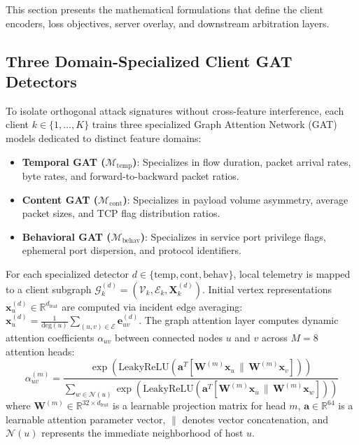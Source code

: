 \documentclass[12pt,a4paper]{report}
\begin{document}
This section presents the mathematical formulations that define the client encoders, loss objectives, server overlay, and downstream arbitration layers.

\subsection{Three Domain-Specialized Client GAT Detectors}
To isolate orthogonal attack signatures without cross-feature interference, each client $k \in \{1, \dots, K\}$ trains three specialized Graph Attention Network (GAT) models dedicated to distinct feature domains:
\begin{itemize}
    \item \textbf{Temporal GAT ($\mathcal{M}_{\text{temp}}$)}: Specializes in flow duration, packet arrival rates, byte rates, and forward-to-backward packet ratios.
    \item \textbf{Content GAT ($\mathcal{M}_{\text{cont}}$)}: Specializes in payload volume asymmetry, average packet sizes, and TCP flag distribution ratios.
    \item \textbf{Behavioral GAT ($\mathcal{M}_{\text{behav}}$)}: Specializes in service port privilege flags, ephemeral port dispersion, and protocol identifiers.
\end{itemize}

For each specialized detector $d \in \{\text{temp}, \text{cont}, \text{behav}\}$, local telemetry is mapped to a client subgraph $\mathcal{G}_k^{(d)} = (\mathcal{V}_k, \mathcal{E}_k, \boldsymbol{X}_k^{(d)})$. Initial vertex representations $\boldsymbol{x}_u^{(d)} \in \mathbb{R}^{d_{\text{feat}}}$ are computed via incident edge averaging: $\boldsymbol{x}_u^{(d)} = \frac{1}{\text{deg}(u)} \sum_{(u, v) \in \mathcal{E}} \boldsymbol{e}_{uv}^{(d)}$. The graph attention layer computes dynamic attention coefficients $\alpha_{uv}$ between connected nodes $u$ and $v$ across $M = 8$ attention heads:
\begin{equation}
\alpha_{uv}^{(m)} = \frac{\exp\left( \text{LeakyReLU}\left( \boldsymbol{a}^T [\boldsymbol{W}^{(m)}\boldsymbol{x}_u \,\|\, \boldsymbol{W}^{(m)}\boldsymbol{x}_v] \right) \right)}{\displaystyle\sum_{w \in \mathcal{N}(u)} \exp\left( \text{LeakyReLU}\left( \boldsymbol{a}^T [\boldsymbol{W}^{(m)}\boldsymbol{x}_u \,\|\, \boldsymbol{W}^{(m)}\boldsymbol{x}_w] \right) \right)}
\label{eq:gat_attn_heads}
\end{equation}
where $\boldsymbol{W}^{(m)} \in \mathbb{R}^{32 \times d_{\text{feat}}}$ is a learnable projection matrix for head $m$, $\boldsymbol{a} \in \mathbb{R}^{64}$ is a learnable attention parameter vector, $\|$ denotes vector concatenation, and $\mathcal{N}(u)$ represents the immediate neighborhood of host $u$.
\end{document}

